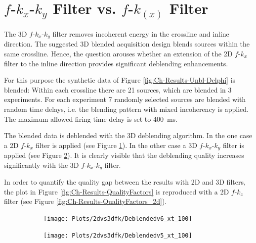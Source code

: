 				
				

\FloatBarrier
\section{$f$-$k_x$-$k_y$ Filter vs. $f$-$k_{(x)}$ Filter}

The 3D $f$-$k_x$-$k_y$ filter removes incoherent energy in the crossline and inline direction. The suggested 3D blended acquisition design blends sources within the same crossline. Hence, the question arouses whether an extension of the 2D $f$-$k_x$ filter to the inline direction provides significant deblending enhancements.

For this purpose the synthetic data of Figure \ref{fig:Ch-Results-Unbl-Delphi} is blended: Within each crossline there are 21 sources, which are blended in 3 experiments. For each experiment 7 randomly selected sources are blended with random time delays, i.e. the blending pattern with mixed incoherency is applied. The maximum allowed firing time delay is set to \SI{400}{\milli\second}. 

The blended data is deblended with the 3D deblending algorithm. In the one case a 2D $f$-$k_x$ filter is applied (see Figure \ref{fig:Ch-Results-Deblending-2dfk}). In the other case a 3D $f$-$k_x$-$k_y$ filter is applied (see Figure \ref{fig:Ch-Results-Deblending-3dfk}). It is clearly visible that the deblending quality increases significantly with the 3D $f$-$k_x$-$k_y$ filter.

In order to quantify the quality gap between the results with 2D and 3D filters, the plot in Figure \ref{fig:Ch-Results-QualityFactors} is reproduced with a 2D $f$-$k_x$ filter (see Figure \ref{fig:Ch-Results-QualityFactors_2d}).
 
\begin{figure}
	
	\centering
	\begin{subfigure}[t]{0.8\textwidth}
		\texttt{[image: Plots/2dvs3dfk/Deblendedv6\_xt\_100]}
		\caption{}
		\label{fig:Ch-Results-Deblending-2dfk}
	\end{subfigure}
	
	\par\bigskip
	
	\centering
	\begin{subfigure}[t]{0.8\textwidth}
		\texttt{[image: Plots/2dvs3dfk/Deblendedv5\_xt\_100]}
		\caption{}
		\label{fig:Ch-Results-Deblending-3dfk}
	\end{subfigure}
	
	\caption{}
	\label{fig:Ch-Results-Deblending-2dvs3d-fk}
\end{figure}

